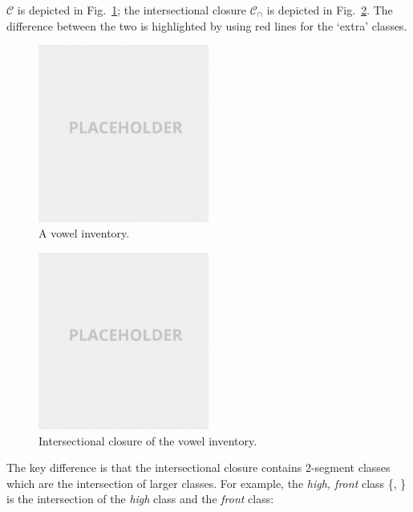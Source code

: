\documentclass[11pt, oneside]{article}   	%
\begin{document}
\vspace{\baselineskip} \noindent $\mathcal C$ is depicted in Fig.~\ref{fig:vowel_inventory}; the intersectional closure $\mathcal C_\cap$ is depicted in Fig.~\ref{fig:vowel_inventory_closure}. The difference between the two is highlighted by using red lines for the `extra' classes.

\begin{figure}[h]
  \centering
  \includegraphics[width=0.5\textwidth]{placeholder.png}
  \caption{A vowel inventory.}
  \label{fig:vowel_inventory}
\end{figure}

\begin{figure}[h]
  \centering
  \includegraphics[width=0.5\textwidth]{placeholder.png}
  \caption{Intersectional closure of the vowel inventory.}
  \label{fig:vowel_inventory_closure}
\end{figure}

The key difference is that the intersectional closure contains 2-segment classes which are the intersection of larger classes. For example, the \textit{high, front} class \{, \} is the intersection of the \textit{high} class and the \textit{front} class:
\end{document}
